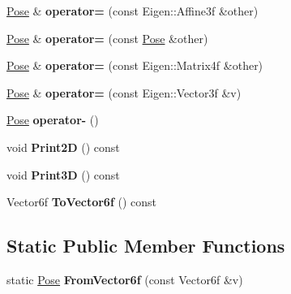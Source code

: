 \begin{DoxyCompactItemize}
\hyperlink{classdepth__clustering_1_1Pose}{Pose} \& {\bfseries operator=} (const Eigen\+::\+Affine3f \&other)
\item 
\mbox{\label{classdepth__clustering_1_1Pose_a05bd18a5e4c30f345b3a18de0274d6e2}} 
\hyperlink{classdepth__clustering_1_1Pose}{Pose} \& {\bfseries operator=} (const \hyperlink{classdepth__clustering_1_1Pose}{Pose} \&other)
\item 
\mbox{\label{classdepth__clustering_1_1Pose_ad753de7d1d9d6e3923f352820a0a8be0}} 
\hyperlink{classdepth__clustering_1_1Pose}{Pose} \& {\bfseries operator=} (const Eigen\+::\+Matrix4f \&other)
\item 
\mbox{\label{classdepth__clustering_1_1Pose_abda699c75125980c1d3dab5cde5a1881}} 
\hyperlink{classdepth__clustering_1_1Pose}{Pose} \& {\bfseries operator=} (const Eigen\+::\+Vector3f \&v)
\item 
\mbox{\label{classdepth__clustering_1_1Pose_a885967b7ce945d7916c14664c6f5da5f}} 
\hyperlink{classdepth__clustering_1_1Pose}{Pose} {\bfseries operator-\/} ()
\item 
\mbox{\label{classdepth__clustering_1_1Pose_a7bf20eedbaf08b0286df4548a9484f54}} 
void {\bfseries Print2D} () const
\item 
\mbox{\label{classdepth__clustering_1_1Pose_af80ae6270f75c20d4a2ee048baa4a889}} 
void {\bfseries Print3D} () const
\item 
\mbox{\label{classdepth__clustering_1_1Pose_aea9c6f93dabb0acb83243d76fa4f93f3}} 
Vector6f {\bfseries To\+Vector6f} () const
\end{DoxyCompactItemize}
\subsection*{Static Public Member Functions}
\begin{DoxyCompactItemize}
\item 
\mbox{\label{classdepth__clustering_1_1Pose_a7bbd2374e9891af96c546015a2f2d4d3}} 
static \hyperlink{classdepth__clustering_1_1Pose}{Pose} {\bfseries From\+Vector6f} (const Vector6f \&v)
\end{DoxyCompactItemize}


